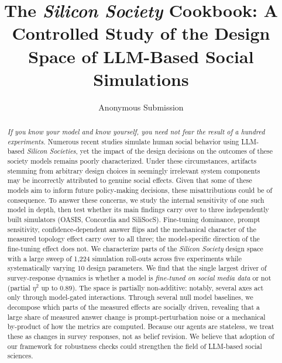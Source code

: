 \documentclass[letterpaper]{article} %
\title{The \textit{Silicon Society} Cookbook: A Controlled Study of the Design Space of LLM-Based Social Simulations}
\author{
    Anonymous Submission
}
\begin{document}
\maketitle

\begin{abstract}

\textit{If you know your model and know yourself, you need not fear the result of a hundred experiments.}
Numerous recent studies simulate human social behavior using LLM-based \textit{Silicon Societies}, yet the impact of the design decisions on the outcomes of these society models remains poorly characterized. Under these circumstances, artifacts stemming from arbitrary design choices in seemingly irrelevant system components may be incorrectly attributed to genuine social effects. Given that some of these models aim to inform future policy-making decisions, these misattributions could be of consequence. To answer these concerns, we study the internal sensitivity of one such model in depth, then test whether its main findings carry over to three independently built simulators (OASIS, Concordia and SiliSocS). Fine-tuning dominance, prompt sensitivity, confidence-dependent answer flips and the mechanical character of the measured topology effect carry over to all three; the model-specific direction of the fine-tuning effect does not. We characterize parts of the \textit{Silicon Society} design space with a large sweep of 1{,}224 simulation roll-outs across five experiments while systematically varying 10 design parameters. We find that the single largest driver of survey-response dynamics is whether a model is \emph{fine-tuned on social media data} or not (partial $\eta^2$ up to $0.89$). The space is partially non-additive: notably, several axes act only through model-gated interactions. Through several null model baselines, we decompose which parts of the measured effects are socially driven, revealing that a large share of measured answer change is prompt-perturbation noise or a mechanical by-product of how the metrics are computed. Because our agents are stateless, we treat these as changes in survey responses, not as belief revision. We believe that adoption of our framework for robustness checks could strengthen the field of LLM-based social sciences.
\end{abstract}
\end{document}
